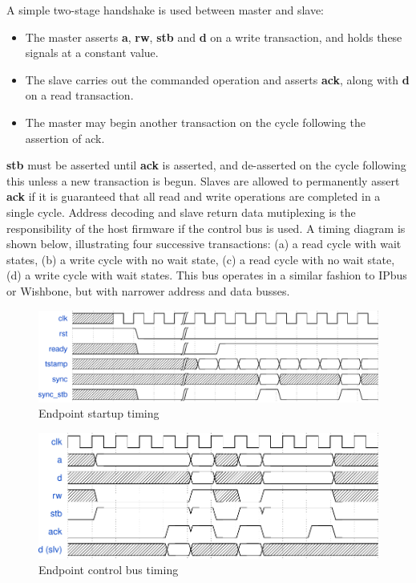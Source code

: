 \documentclass{article}
\begin{document}
A simple two-stage handshake is used between master and slave:

\begin{itemize}
\item The master asserts \textbf{a}, \textbf{rw}, \textbf{stb} and \textbf{d} on a write transaction, and holds these signals at a constant value.
\item The slave carries out the commanded operation and asserts \textbf{ack}, along with \textbf{d} on a read transaction.
\item The master may begin another transaction on the cycle following the assertion of ack.
\end{itemize}

\textbf{stb} must be asserted until \textbf{ack} is asserted, and de-asserted on the cycle following this unless a new transaction is begun. Slaves are allowed to permanently assert \textbf{ack} if it is guaranteed that all read and write operations are completed in a single cycle. Address decoding and slave return data mutiplexing is the responsibility of the host firmware if the control bus is used. A timing diagram is shown below, illustrating four successive transactions: (a) a read cycle with wait states, (b) a write cycle with no wait state, (c) a read cycle with no wait state, (d) a write cycle with wait states. This bus operates in a similar fashion to IPbus or Wishbone, but with narrower address and data busses.



\begin{figure}[p]
  \includegraphics[width=1\textwidth]{dts_endpoint_startup_timing.pdf}%
  \caption{Endpoint startup timing}
  \label{fig:endpoint_startup_timing}
\end{figure}

\begin{figure}[p]
  \includegraphics[width=1\textwidth]{dts_endpoint_ctrl_bus_timing.pdf}%
  \caption{Endpoint control bus timing}
  \label{fig:endpoint_bus_timing}
\end{figure}
\end{document}
